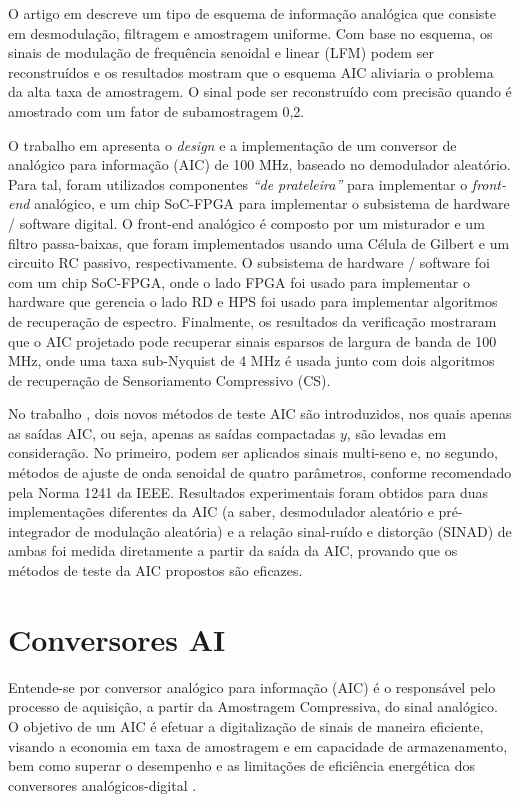 \documentclass[a4paper, 12pt]{article}
\begin{document}
O artigo em \cite{zeng2019interception} descreve um tipo de esquema de informação analógica que consiste em desmodulação, filtragem e amostragem uniforme. Com base no esquema, os sinais de modulação de frequência senoidal e linear (LFM) podem ser reconstruídos e os resultados mostram que o esquema AIC aliviaria o problema da alta taxa de amostragem. O sinal pode ser reconstruído com precisão quando é amostrado com um fator de subamostragem 0,2.

O trabalho em \cite{lopez2019analog} apresenta o \textit{design} e a implementação de um conversor de analógico para informação (AIC) de 100 MHz, baseado no demodulador aleatório. Para tal, foram utilizados componentes \textit{``de prateleira''} para implementar o \textit{front-end} analógico, e um chip SoC-FPGA para implementar o subsistema de hardware / software digital. 
O front-end analógico é composto por um misturador e um filtro passa-baixas, que foram implementados usando uma Célula de Gilbert e um circuito RC passivo, respectivamente. O subsistema de hardware / software foi com um chip SoC-FPGA, onde o lado FPGA foi usado para implementar o hardware que gerencia o lado RD e HPS foi usado para implementar algoritmos de recuperação de espectro. Finalmente, os resultados da verificação mostraram que o AIC projetado pode recuperar sinais esparsos de largura de banda de 100 MHz, onde uma taxa sub-Nyquist de 4 MHz é usada junto com dois algoritmos de recuperação de Sensoriamento Compressivo (CS).

No trabalho \cite{silva2019novel}, dois novos métodos de teste AIC são introduzidos, nos quais apenas as saídas AIC, ou seja, apenas as saídas compactadas $y$, são levadas em consideração. No primeiro, podem ser aplicados sinais multi-seno e, no segundo, métodos de ajuste de onda senoidal de quatro parâmetros, conforme recomendado pela Norma 1241 da IEEE. Resultados experimentais foram obtidos para duas implementações diferentes da AIC (a saber, desmodulador aleatório e pré-integrador de modulação aleatória) e a relação sinal-ruído e distorção (SINAD) de ambas foi medida diretamente a partir da saída da AIC, provando que os métodos de teste da AIC propostos são eficazes.



\section{Conversores AI}

Entende-se por conversor analógico para informação (AIC) é o responsável pelo processo de aquisição, a partir da Amostragem Compressiva, do sinal analógico. O objetivo de um AIC é efetuar a digitalização de sinais de maneira eficiente, visando a economia em taxa de amostragem e em capacidade de armazenamento, bem como superar o desempenho e as limitações de eficiência energética dos conversores analógicos-digital \cite{Bruno2019}. 
\end{document}
